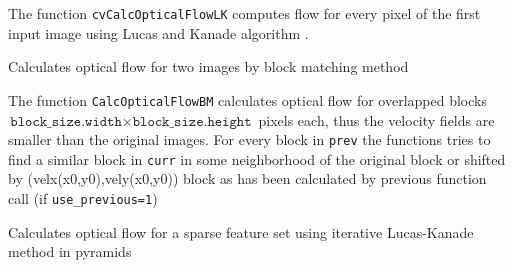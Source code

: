 The function \texttt{cvCalcOpticalFlowLK} computes flow for every pixel of the first input image using Lucas and Kanade algorithm
\cite{Lucas81}.

\label{CalcOpticalFlowBM}

Calculates optical flow for two images by block matching method


\begin{description}
\end{description}

The function \texttt{CalcOpticalFlowBM} calculates optical
flow for overlapped blocks $\texttt{block\_size.width} \times
\texttt{block\_size.height}$ pixels each, thus the velocity
fields are smaller than the original images. For every block
in \texttt{prev} the functions tries to find a similar block in
\texttt{curr} in some neighborhood of the original block or shifted by
(velx(x0,y0),vely(x0,y0)) block as has been calculated by previous
function call (if \texttt{use\_previous=1})

\label{CalcOpticalFlowPyrLK}

Calculates optical flow for a sparse feature set using iterative Lucas-Kanade method in pyramids

